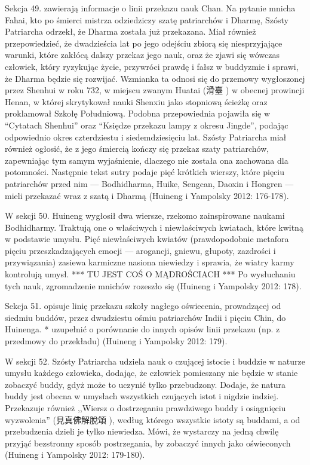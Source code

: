 Sekcja 49. zawierają informacje o linii przekazu nauk Chan.
Na pytanie mnicha Fahai, kto po śmierci mistrza odziedziczy szatę patriarchów i Dharmę, Szósty Patriarcha odrzekł, że Dharma została już przekazana.
Miał również przepowiedzieć, że dwadzieścia lat po jego odejściu zbiorą się niesprzyjające warunki, które zakłócą dalszy przekaz jego nauk, oraz że zjawi się wówczas człowiek, który ryzykując życie, przywróci prawdę i fałsz w buddyzmie i sprawi, że Dharma będzie się rozwijać.
Wzmianka ta odnosi się do przemowy wygłoszonej przez Shenhui w roku 732, w miejscu zwanym Huatai (滑臺 ) w obecnej prowincji Henan, w której skrytykował nauki Shenxiu jako stopniową ścieżkę oraz proklamował Szkołę Południową.
Podobna przepowiednia pojawiła się w ``Cytatach Shenhui'' oraz ``Księdze przekazu lampy z okresu Jingde'', podając odpowiednio okres czterdziestu i siedemdziesięciu lat.
Szósty Patriarcha miał również ogłosić, że z jego śmiercią kończy się przekaz szaty patriarchów, zapewniając tym samym wyjaśnienie, dlaczego nie została ona zachowana dla potomności.
Następnie tekst sutry podaje pięć krótkich wierszy, które pięciu patriarchów przed nim --- Bodhidharma, Huike, Sengcan, Daoxin i Hongren --- mieli przekazać wraz z szatą i Dharmą
(Huineng i Yampolsky 2012: 176-178).

W sekcji 50. Huineng wygłosił dwa wiersze, rzekomo zainspirowane naukami Bodhidharmy.
Traktują one o właściwych i niewłaściwych kwiatach, które kwitną w podstawie umysłu.
Pięć niewłaściwych kwiatów (prawdopodobnie metafora pięciu przeszkadzających emocji --- arogancji, gniewu, głupoty, zazdrości i przywiązania) zasiewa karmiczne nasiona niewiedzy i sprawia, że wiatry karmy kontrolują umysł.
*** TU JEST COŚ O MĄDROŚCIACH ***
Po wysłuchaniu tych nauk, zgromadzenie mnichów rozeszło się
(Huineng i Yampolsky 2012: 178).

Sekcja 51. opisuje linię przekazu szkoły nagłego oświecenia, prowadzącej od siedmiu buddów, przez dwudziestu ośmiu patriarchów Indii i pięciu Chin, do Huinenga.
* uzupełnić o porównanie do innych opisów linii przekazu (np. z przedmowy do przekładu)
(Huineng i Yampolsky 2012: 179).

W sekcji 52. Szósty Patriarcha udziela nauk o czującej istocie i buddzie w naturze umysłu każdego człowieka, dodając, że człowiek pomieszany nie będzie w stanie zobaczyć buddy, gdyż może to uczynić tylko przebudzony.
Dodaje, że natura buddy jest obecna w umysłach wszystkich czujących istot i nigdzie indziej.
Przekazuje również ,,Wiersz o dostrzeganiu prawdziwego buddy i osiągnięciu wyzwolenia'' (見真佛解脫頌 ), według którego wszystkie istoty są buddami, a od przebudzenia dzieli je tylko niewiedza.
Mówi, że wystarczy na jedną chwilę przyjąć bezstronny sposób postrzegania, by zobaczyć innych jako oświeconych
(Huineng i Yampolsky 2012: 179-180).

